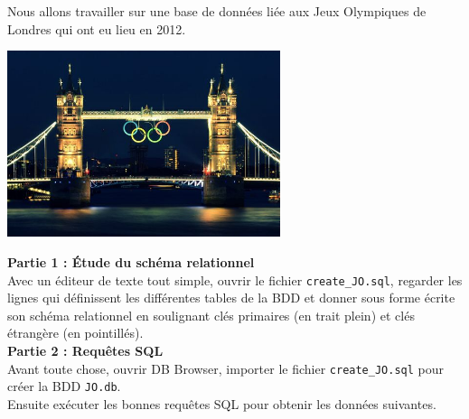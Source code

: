 \begin{exercice}[ : JO]
    Nous allons travailler sur une base de données liée aux Jeux Olympiques de Londres qui ont eu lieu en 2012.\\
    \begin{center}
        \includegraphics[width=8cm]{img/jo_london}
    \end{center}
    
    \textbf{\large Partie 1 : \'Etude du schéma relationnel}\\
    
    Avec un éditeur de texte tout simple, ouvrir le fichier \texttt{create\_JO.sql}, regarder les lignes qui définissent les différentes tables de la BDD et donner sous forme écrite son schéma relationnel en soulignant clés primaires (en trait plein) et clés étrangère (en pointillés).\\
    
    \textbf{\large Partie 2 : Requêtes SQL}\\
    
    Avant toute chose, ouvrir DB Browser, importer le fichier \texttt{create\_JO.sql} pour créer la BDD \texttt{JO.db}.\\
    Ensuite exécuter les bonnes requêtes SQL pour obtenir les données suivantes.\\
    

\end{exercice}
